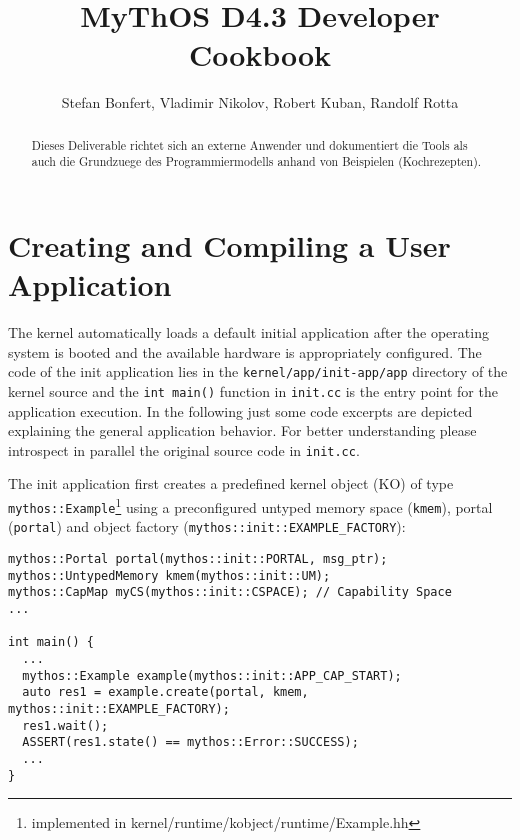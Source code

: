 

\title{MyThOS D4.3 Developer Cookbook}
\author{Stefan Bonfert, Vladimir Nikolov, Robert Kuban, Randolf Rotta}



\maketitle

\begin{abstract} 

Dieses Deliverable richtet sich an externe Anwender und dokumentiert die Tools
als auch die Grundzuege des Programmiermodells anhand von Beispielen
(Kochrezepten).

\end{abstract}

\newpage
\tableofcontents

\section{Creating and Compiling a User Application}
\label{sec:init-app}

The \mythos kernel automatically loads a default initial application after the
operating system is booted and the available hardware is appropriately
configured. The code of the init application lies in the
\texttt{kernel/app/init-app/app} directory of the kernel source and the
\texttt{int main()} function in \texttt{init.cc} is the entry point for the
application execution. In the following just some code excerpts are depicted
explaining the general application behavior. For better understanding please
introspect in parallel the original source code in \texttt{init.cc}.

The init application first creates a predefined kernel object (KO) of type
\texttt{mythos::Example}\footnote{implemented in
kernel/runtime/kobject/runtime/Example.hh} using a preconfigured untyped memory
space (\texttt{kmem}), portal (\texttt{portal}) and object factory
(\texttt{mythos::init::EXAMPLE\_FACTORY}):
\lstset{language=c++}

\begin{lstlisting}
mythos::Portal portal(mythos::init::PORTAL, msg_ptr);
mythos::UntypedMemory kmem(mythos::init::UM);
mythos::CapMap myCS(mythos::init::CSPACE); // Capability Space
...

int main() {
  ...
  mythos::Example example(mythos::init::APP_CAP_START);
  auto res1 = example.create(portal, kmem, mythos::init::EXAMPLE_FACTORY);
  res1.wait();
  ASSERT(res1.state() == mythos::Error::SUCCESS);
  ...   
}
\end{lstlisting}

